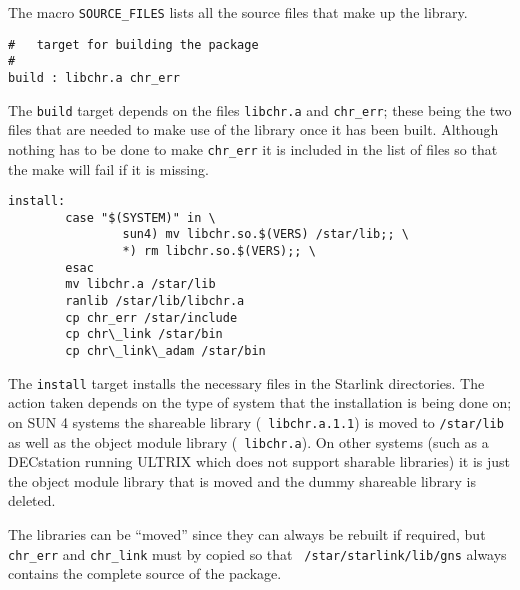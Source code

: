 The macro {\tt SOURCE\_FILES} lists all the source files that make up the
library.
\begin{verbatim}
#   target for building the package
#
build : libchr.a chr_err
\end{verbatim}
The {\tt build} target depends on the files {\tt libchr.a} and {\tt chr\_err};
these being the two files that are needed to make use of the library once it has
been built. Although nothing has to be done to make {\tt chr\_err} it is
included in the list of files so that the make will fail if it is missing.
\begin{verbatim}
install:
        case "$(SYSTEM)" in \
                sun4) mv libchr.so.$(VERS) /star/lib;; \
                *) rm libchr.so.$(VERS);; \
        esac
        mv libchr.a /star/lib
        ranlib /star/lib/libchr.a
        cp chr_err /star/include
        cp chr\_link /star/bin
        cp chr\_link\_adam /star/bin
\end{verbatim}
The {\tt install} target installs the necessary files in the Starlink
directories. The action taken depends on the type of system that the
installation is being done on; on SUN 4 systems the shareable library ({\tt
libchr.a.1.1}) is moved to {\tt /star/lib} as well as the 
object module library ({\tt
libchr.a}). On other systems (such as a DECstation running ULTRIX
which does not support sharable libraries) it is just the object module library 
that is moved and the dummy shareable library is deleted.

The libraries can be ``moved'' since they can always be rebuilt
if required, but {\tt chr\_err} and {\tt chr\_link} must by copied so that {\tt
/star/starlink/lib/gns} always contains the complete source of the package.

